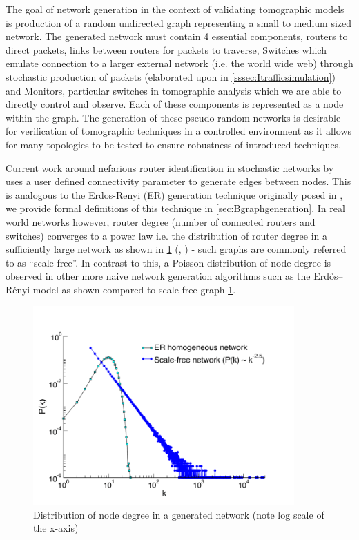 The goal of network generation in the context of validating tomographic models is production of a random undirected graph representing a small to medium sized network. The generated network must contain 4 essential components, routers to direct packets, links between routers for packets to traverse, Switches which emulate connection to a larger external network (i.e. the world wide web) through stochastic production of packets (elaborated upon in \cref{sssec:Itrafficsimulation}) and Monitors, particular switches in tomographic analysis which we are able to directly control and observe. Each of these components is represented as a node within the graph. The generation of these pseudo random networks is desirable for verification of tomographic techniques in a controlled environment as it allows for many topologies to be tested to ensure robustness of introduced techniques.\par
Current work around nefarious router identification in stochastic networks by \cite{barnes_stochastic_2020} uses a user defined connectivity parameter to generate edges between nodes. This is analogous to the Erdos-Renyi (ER) generation technique originally posed in \cite{erdos_random_1959}, we provide formal definitions of this technique in \cref{sec:Bgraphgeneration}. In real world networks however, router degree (number of connected routers and switches) converges to a power law i.e. the distribution of router degree in a sufficiently large network as shown in \ref{fig:nddist} (\cite{chen_origin_2002}, \cite{zhao_measurement_2020}) - such graphs are commonly referred to as “scale-free”. In contrast to this, a Poisson distribution of node degree is observed in other more naive network generation algorithms such as the Erdős–Rényi model as shown compared to scale free graph \ref{fig:nddist}.
\begin{figure}[ht]
    \centering
    \includegraphics[width=10cm]{figs/nodedegree-dist.png}
    \caption[Distribution of node degree in a generated network]{Distribution of node degree in a generated network (note log scale of the x-axis) \cite{baronchelli_networks_2013}}
    \label{fig:nddist}
\end{figure}
